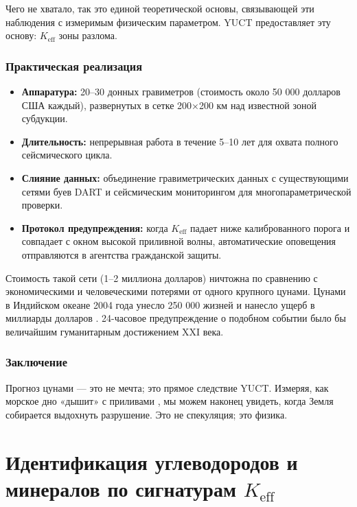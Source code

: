 \documentclass[12pt,a4paper]{article}
\theoremstyle{remark}
\newcommand{\Keff}{K_{\mathrm{eff}}}
\begin{document}
	Чего не хватало, так это единой теоретической основы, связывающей эти наблюдения с измеримым физическим параметром. YUCT предоставляет эту основу: \(K_{\mathrm{eff}}\) зоны разлома.
	
	\subsubsection{Практическая реализация}
	
	\begin{itemize}
		\item \textbf{Аппаратура:} 20–30 донных гравиметров (стоимость около 50 000 долларов США каждый), развернутых в сетке 200×200 км над известной зоной субдукции.
		\item \textbf{Длительность:} непрерывная работа в течение 5–10 лет для охвата полного сейсмического цикла.
		\item \textbf{Слияние данных:} объединение гравиметрических данных с существующими сетями буев DART \cite{NOAA2024} и сейсмическим мониторингом \cite{USGS2024} для многопараметрической проверки.
		\item \textbf{Протокол предупреждения:} когда \(K_{\mathrm{eff}}\) падает ниже калиброванного порога и совпадает с окном высокой приливной волны, автоматические оповещения отправляются в агентства гражданской защиты.
	\end{itemize}
	
	Стоимость такой сети (1–2 миллиона долларов) ничтожна по сравнению с экономическими и человеческими потерями от одного крупного цунами. Цунами в Индийском океане 2004 года унесло 250 000 жизней и нанесло ущерб в миллиарды долларов \cite{NOAA2024, USGS2024}. 24-часовое предупреждение о подобном событии было бы величайшим гуманитарным достижением XXI века.
	
	\subsubsection{Заключение}
	
	Прогноз цунами — это не мечта; это прямое следствие YUCT. Измеряя, как морское дно «дышит» с приливами \cite{Tolstoy2013}, мы можем наконец увидеть, когда Земля собирается выдохнуть разрушение. Это не спекуляция; это физика.
	
	\section{Идентификация углеводородов и минералов по сигнатурам \(\Keff\)}
	\label{sec:identification}
	
\end{document}
